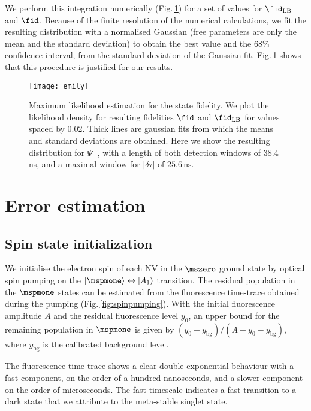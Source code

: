 We perform this integration numerically (Fig.\,\ref{fig:fidemily}) for a set of values for $\fid_\mathrm{LB}$ and $\fid$. Because of the finite resolution of the numerical calculations, we fit the resulting distribution with a normalised Gaussian (free parameters are only the mean and the standard deviation) to obtain the best value and the 68$\%$ confidence interval, from the standard deviation of the Gaussian fit. Fig.\,\ref{fig:fidemily} shows that this procedure is justified for our results.

\begin{figure}[h]
    \centering
    \texttt{[image: emily]}
    \caption{Maximum likelihood estimation for the state fidelity. We plot the likelihood density for resulting fidelities $\fid$ and $\fid_\mathrm{LB}$ for values spaced by 0.02. Thick lines are gaussian fits from which the means and standard deviations are obtained. Here we show the resulting distribution for $\Psi^-$, with a length of both detection windows of 38.4\,ns, and a maximal window for $|\delta \tau|$ of $25.6\,\text{ns}$.}
	\label{fig:fidemily}
\end{figure}


\section{Error estimation}

\subsection{Spin state initialization}
We initialise the electron spin of each NV in the $\mszero$ ground state by optical spin pumping on the $\ket{\mspmone}\leftrightarrow\ket{A_1}$ transition. The residual population in the $\mspmone$ states can be estimated from the fluorescence time-trace obtained during the pumping (Fig.\,\ref{fig:spinpumping}). With the initial fluorescence amplitude $A$ and the residual fluorescence level $y_0$, an upper bound for the remaining population in $\mspmone$ is given by $(y_0-y_{\mathrm{bg}})/(A+y_0-y_{\mathrm{bg}})$, where $y_{\mathrm{bg}}$ is the calibrated background level\cite{Robledo:2011fs}.

The fluorescence time-trace shows a clear double exponential behaviour with a fast component, on the order of a hundred nanoseconds, and a slower component on the order of microseconds. The fast timescale indicates a fast transition to a dark state that we attribute to the meta-stable singlet state.

